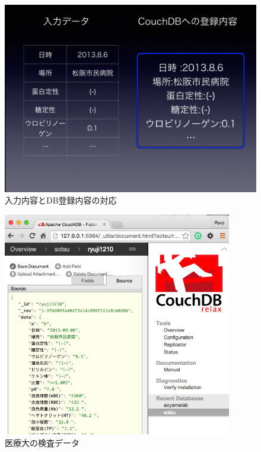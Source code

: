 			\begin{figure}[htbp]
				\begin{center}
					\includegraphics[width=15cm, bb=0 0 1435 1073, clip]{./gazou/csv-data-trans2.png}
				\end{center}
				\caption{入力内容とDB登録内容の対応}
				\label{csv-data-trans}
			\end{figure}

			\begin{figure}[htbp]
				\begin{center}
					\includegraphics[width=10cm, bb=0 0 581 571, clip]{./gazou/kensa-data.png}
				\end{center}
				\caption{医療大の検査データ}
				\label{iryoudai-kensa-data}
			\end{figure}

